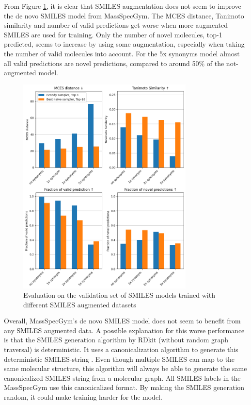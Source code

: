 From Figure \ref{fig:smiles_augm}, it is clear that SMILES augmentation does not seem to improve the de novo SMILES model from MassSpecGym.
The MCES distance, Tanimoto similarity and number of valid predictions get worse when more augmented SMILES are used for training.
Only the number of novel molecules, top-1 predicted, seems to increase by using some augmentation, especially when taking the number of valid molecules into account. 
For the 5x synonyms model almost all valid predictions are novel predictions, compared to around 50\% of the not-augmented model.

\begin{figure}[h]
    \centering
    \includegraphics[width=0.79\textwidth]{figures/results/smiles_augmentation_with_tanimoto.png}
    \caption{Evaluation on the validation set of SMILES models trained with different SMILES augmented datasets}
    \label{fig:smiles_augm}
\end{figure}

\newpage
Overall, MassSpecGym's de novo SMILES model does not seem to benefit from any SMILES augmented data.
A possible explanation for this worse performance is that the SMILES generation algorithm by RDkit (without random graph traversal) is deterministic.
It uses a canonicalization algorithm to generate this deterministic SMILES-string \cite{daylight_smiles_theory}.
Even though multiple SMILES can map to the same molecular structure, this algorithm will always be able to generate the same canonicalized SMILES-string from a molecular graph.
All SMILES labels in the MassSpecGym use this canonicalized format. 
By making the SMILES generation random, it could make training harder for the model.

